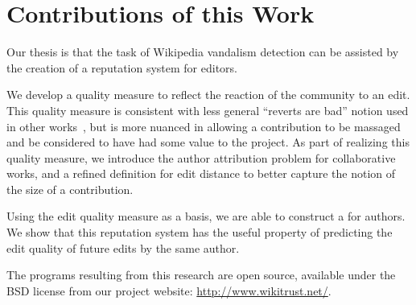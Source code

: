 \section{Contributions of this Work}

Our thesis is that the task of Wikipedia vandalism detection
can be assisted by the creation of a reputation system
for editors.

We develop a quality measure to reflect the reaction of
the community to an edit.
This quality measure is consistent with less general
``reverts are bad'' notion used in other
works~\cite{Smets2008,Itakura2009,Belani2010,West2010},
but is more nuanced in allowing a contribution to be massaged
and be considered to have had some value to the project.
As part of realizing this quality measure, we introduce the
author attribution problem for collaborative works,
and a refined definition for edit distance to better capture
the notion of the size of a contribution.

Using the edit quality measure as a basis, we are able
to construct a  for authors.
We show that this reputation system has the useful property
of predicting the edit quality of future edits by the same
author.

The programs resulting from this research are open source,
available under the BSD license from our project website:
\url{http://www.wikitrust.net/}.

